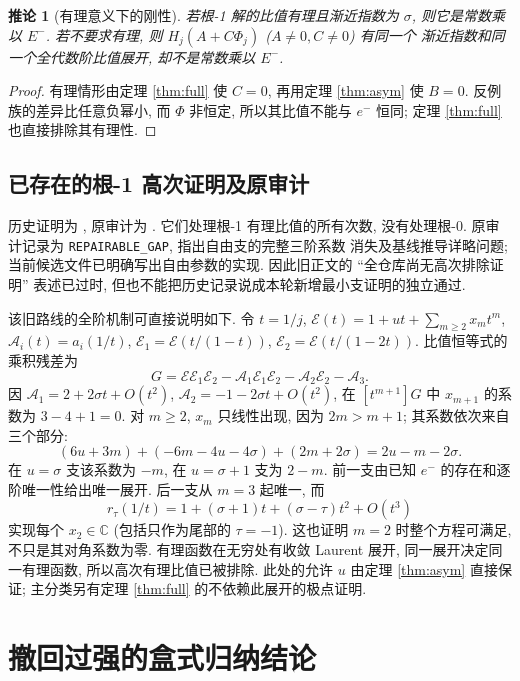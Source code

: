\documentclass[UTF8]{ctexart}
\newtheorem{corollary}[theorem]{推论}
\newcommand{\sig}{\sigma}
\begin{document}
\begin{corollary}[有理意义下的刚性]\label{thm:rigid}
 若根-1 解的比值有理且渐近指数为 $\sig$, 则它是常数乘以 $E^-$.
 若不要求有理, 则 $H_j(A+C\Phi_j)$ ($A\ne0,C\ne0$) 有同一个
 渐近指数和同一个全代数阶比值展开, 却不是常数乘以 $E^-$.
\end{corollary}
\begin{proof}
 有理情形由定理 \ref{thm:full} 使 $C=0$, 再用定理 \ref{thm:asym}
 使 $B=0$. 反例族的差异比任意负幂小, 而 $\Phi$ 非恒定,
 所以其比值不能与 $e^-$ 恒同; 定理 \ref{thm:full} 也直接排除其有理性.
\end{proof}

\subsection{已存在的根-1 高次证明及原审计}\label{sec:oldproof}

历史证明为
,
原审计为
.
它们处理根-1 有理比值的所有次数, 没有处理根-0.
原审计记录为 \texttt{REPAIRABLE\_GAP}, 指出自由支的完整三阶系数
消失及基线推导详略问题; 当前候选文件已明确写出自由参数的实现.
因此旧正文的 ``全仓库尚无高次排除证明'' 表述已过时,
但也不能把历史记录说成本轮新增最小支证明的独立通过.

该旧路线的全阶机制可直接说明如下. 令 $t=1/j$,
$\mathcal E(t)=1+ut+\sum_{m\ge2}x_mt^m$, $\mathcal A_i(t)=a_i(1/t)$,
$\mathcal E_1=\mathcal E(t/(1-t))$,
$\mathcal E_2=\mathcal E(t/(1-2t))$.
比值恒等式的乘积残差为
\[
 G=\mathcal E\mathcal E_1\mathcal E_2
   -\mathcal A_1\mathcal E_1\mathcal E_2-\mathcal A_2\mathcal E_2-\mathcal A_3.
\]
因 $\mathcal A_1=2+2\sig t+O(t^2)$,
$\mathcal A_2=-1-2\sig t+O(t^2)$,
在 $[t^{m+1}]G$ 中 $x_{m+1}$ 的系数为 $3-4+1=0$.
对 $m\ge2$, $x_m$ 只线性出现, 因为 $2m>m+1$;
其系数依次来自三个部分:
\[
 (6u+3m)+(-6m-4u-4\sig)+(2m+2\sig)=2u-m-2\sig.
\]
在 $u=\sig$ 支该系数为 $-m$, 在 $u=\sig+1$ 支为 $2-m$.
前一支由已知 $e^-$ 的存在和逐阶唯一性给出唯一展开.
后一支从 $m=3$ 起唯一, 而
\[
 r_\tau(1/t)=1+(\sig+1)t+(\sig-\tau)t^2+O(t^3)
\]
实现每个 $x_2\in\mathbb C$ (包括只作为尾部的 $\tau=-1$).
这也证明 $m=2$ 时整个方程可满足, 不只是其对角系数为零.
有理函数在无穷处有收敛 Laurent 展开, 同一展开决定同一有理函数,
所以高次有理比值已被排除. 此处的允许 $u$ 由定理 \ref{thm:asym}
直接保证; 主分类另有定理 \ref{thm:full} 的不依赖此展开的极点证明.

\section{撤回过强的盒式归纳结论}\label{sec:box}
\end{document}
